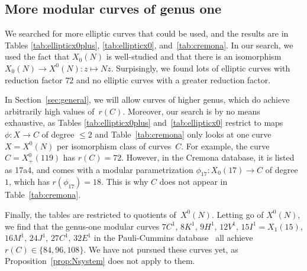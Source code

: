 \documentclass{amsart}
\newcommand{\xnul}[1]{X^0(#1)}
\newcommand{\xnulN}{\xnul{N}}
\newcommand{\xplus}[1]{X^0_+(#1)}
\numberwithin{equation}{section}
\theoremstyle{definition}
\begin{document}
\subsection{More modular curves of genus one}\label{sec:searchelliptic}

We searched for more elliptic curves that could be used,
and the results are in Tables \ref{tab:ellipticx0plus}, \ref{tab:ellipticx0}, and~\ref{tab:cremona}.
In our search, we used the fact that $X_0(N)$ is well-studied
and that there is an isomorphism $X_0(N)\rightarrow \xnulN : z\mapsto Nz$.
Surpisingly, we found lots of elliptic curves with
reduction factor $72$ and no elliptic curves
with a greater reduction factor.

In Section~\ref{sec:general}, we will allow
curves of higher genus, which do achieve arbitrarily high
values of~$r(C)$.
Moreover, our search is by no means exhaustive,
as Tables \ref{tab:ellipticx0plus} and~\ref{tab:ellipticx0}
restrict to maps $\phi : X\rightarrow C$ of degree $\leq 2$
and Table~\ref{tab:cremona} only looks at one curve
$X = \xnulN$ per isomorphism class of curves~$C$.
For example, the curve $C = \xplus{119}$ has $r(C) = 72$.
However, in the Cremona database, it is listed as 17a4,
and comes with a modular parametrization
$\phi_{17} : X_0(17)\rightarrow C$ of degree~$1$,
which has $r(\phi_{17}) = 18$. This is why $C$
does not appear in Table~\ref{tab:cremona}.

Finally, the tables are restricted to quotients of~$\xnulN$.
Letting go of $\xnulN$, we find that the genus-one modular curves
$7C^1$, %
$8K^1$, %
$9H^1$, %
$12V^1$, %
$15I^1 = X_1(15)$, %
$16M^1$, %
$24J^1$, %
$27C^1$, %
$32E^1$ %
in the Pauli-Cummins database~\cite{pauli-cummins2003} all achieve  $r(C) \in\{84, 96, 108\}$.
We have not pursued these curves yet, as Proposition~\ref{prop:Nsystem} does not apply to them.
\end{document}
